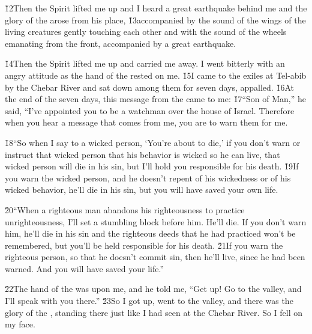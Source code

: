 \v{12}Then the Spirit lifted me up and I heard a great earthquake behind me and the glory of the  arose from his place, \v{13}accompanied by the sound of the wings of the living creatures gently touching each other and with the sound of the wheels emanating from the front, accompanied by a great earthquake.

\v{14}Then the Spirit lifted me up and carried me away. I went bitterly with an angry attitude as the hand of the  rested on me. \v{15}I came to the exiles at Tel-abib by the Chebar River and sat down among them for seven days, appalled. \v{16}At the end of the seven days, this message from the  came to me: \v{17}``Son of Man,'' he said, ``I've appointed you to be a watchman over the house of Israel. Therefore when you hear a message that comes from me, you are to warn them for me.

\v{18}``So when I say to a wicked person, `You're about to die,' if you don't warn or instruct that wicked person that his behavior is wicked so he can live, that wicked person will die in his sin, but I'll hold you responsible for his death. \v{19}If you warn the wicked person, and he doesn't repent of his wickedness or of his wicked behavior, he'll die in his sin, but you will have saved your own life.

\v{20}``When a righteous man abandons his righteousness to practice unrighteousness, I'll set a stumbling block before him. He'll die. If you don't warn him, he'll die in his sin and the righteous deeds that he had practiced won't be remembered, but you'll be held responsible for his death. \v{21}If you warn the righteous person, so that he doesn't commit sin, then he'll live, since he had been warned. And you will have saved your life.''

\v{22}The hand of the  was upon me, and he told me, ``Get up! Go to the valley, and I'll speak with you there.'' \v{23}So I got up, went to the valley, and there was the glory of the , standing there just like I had seen at the Chebar River. So I fell on my face.

